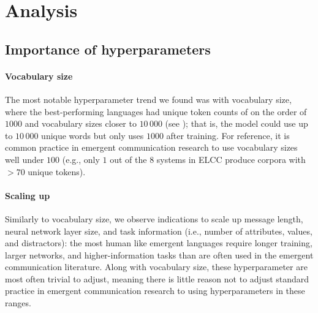 \section{Analysis}
\unskip\label{hpo:sec:analysis}

\subsection{Importance of hyperparameters}

\paragraph{Vocabulary size}
The most notable hyperparameter trend we found was with vocabulary size, where the best-performing languages 
had unique token counts of on the order of $1000$ and vocabulary sizes closer to $10\,000$ (see ); that is, the model could use up to $10\,000$ unique words but only uses $1000$ after training.
For reference, it is common practice in emergent communication research to use vocabulary sizes well under $100$ (e.g., only $1$ out of the $8$ systems in ELCC produce corpora with ${>}70$ unique tokens).

\paragraph{Scaling up}
Similarly to vocabulary size, we observe indications to scale up message length, neural network layer size, and task information (i.e., number of attributes, values, and distractors):
  the most human like emergent languages require longer training, larger networks, and higher-information tasks than are often used in the emergent communication literature.
Along with vocabulary size, these hyperparameter are most often trivial to adjust, meaning there is little reason not to adjust standard practice in emergent communication research to using hyperparameters in these ranges.

